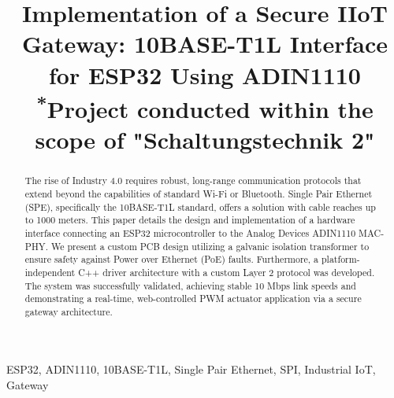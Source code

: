 \documentclass[conference]{IEEEtran}
\begin{document}
	
	\title{Implementation of a Secure IIoT Gateway: 10BASE-T1L Interface for ESP32 Using ADIN1110\\
		{\footnotesize \textsuperscript{*}Project conducted within the scope of "Schaltungstechnik 2"}
	}
	
	\author{
		\and
		\and
	}
	
	\maketitle
	
	\begin{abstract}
		The rise of Industry 4.0 requires robust, long-range communication protocols that extend beyond the capabilities of standard Wi-Fi or Bluetooth. Single Pair Ethernet (SPE), specifically the 10BASE-T1L standard, offers a solution with cable reaches up to 1000 meters. This paper details the design and implementation of a hardware interface connecting an ESP32 microcontroller to the Analog Devices ADIN1110 MAC-PHY. We present a custom PCB design utilizing a galvanic isolation transformer to ensure safety against Power over Ethernet (PoE) faults. Furthermore, a platform-independent C++ driver architecture with a custom Layer 2 protocol was developed. The system was successfully validated, achieving stable 10 Mbps link speeds and demonstrating a real-time, web-controlled PWM actuator application via a secure gateway architecture.
	\end{abstract}
	
	\begin{IEEEkeywords}
		ESP32, ADIN1110, 10BASE-T1L, Single Pair Ethernet, SPI, Industrial IoT, Gateway
	\end{IEEEkeywords}
	
\end{document}
